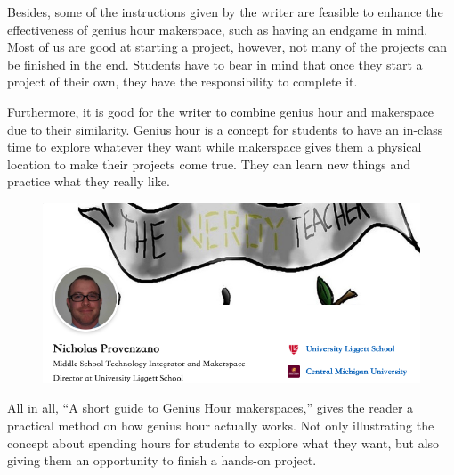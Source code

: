 \documentclass[12pt]{article}
\begin{document}
Besides, some of the instructions given by the writer are feasible to enhance the effectiveness of genius hour makerspace, such as having an endgame in mind. Most of us are good at starting a project, however, not many of the projects can be finished in the end. Students have to bear in mind that once they start a project of their own, they have the responsibility to complete it. 

Furthermore, it is good for the writer to combine genius hour and makerspace due to their similarity. Genius hour is a concept for students to have an in-class time to explore whatever they want while makerspace gives them a physical location to make their projects come true. They can learn new things and practice what they really like.

\begin{figure}
\includegraphics[scale = 0.3]{Photo2}
\end{figure}

All in all,  “A short guide to Genius Hour makerspaces,” gives the reader a practical method on how genius hour actually works. Not only illustrating the concept about spending hours for students to explore what they want, but also giving them an opportunity to finish a hands-on project.
\end{document}
